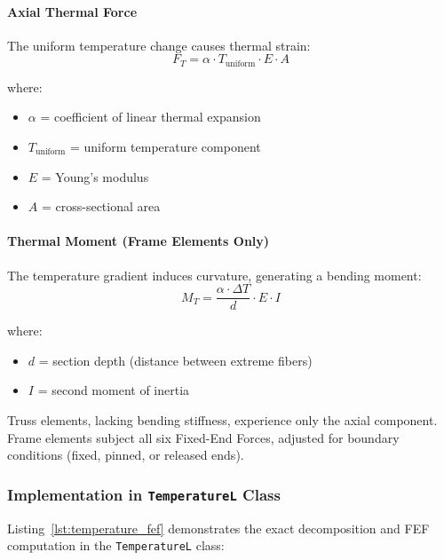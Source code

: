 \documentclass[12pt,a4paper]{article}
\begin{document}
\paragraph{Axial Thermal Force}
The uniform temperature change causes thermal strain:
\begin{equation}
    F_T = \alpha \cdot T_{\text{uniform}} \cdot E \cdot A
\end{equation}

\noindent where:
\begin{itemize}
    \item $\alpha$ = coefficient of linear thermal expansion
    \item $T_{\text{uniform}}$ = uniform temperature component
    \item $E$ = Young's modulus
    \item $A$ = cross-sectional area
\end{itemize}

\paragraph{Thermal Moment (Frame Elements Only)}
The temperature gradient induces curvature, generating a bending moment:
\begin{equation}
    M_T = \frac{\alpha \cdot \Delta T}{d} \cdot E \cdot I
\end{equation}

\noindent where:
\begin{itemize}
    \item $d$ = section depth (distance between extreme fibers)
    \item $I$ = second moment of inertia
\end{itemize}

\noindent Truss elements, lacking bending stiffness, experience only the axial component. Frame elements subject all six Fixed-End Forces, adjusted for boundary conditions (fixed, pinned, or released ends).

\subsubsection{Implementation in \texttt{TemperatureL} Class}

Listing~\ref{lst:temperature_fef} demonstrates the exact decomposition and FEF computation in the \texttt{TemperatureL} class:
\end{document}
